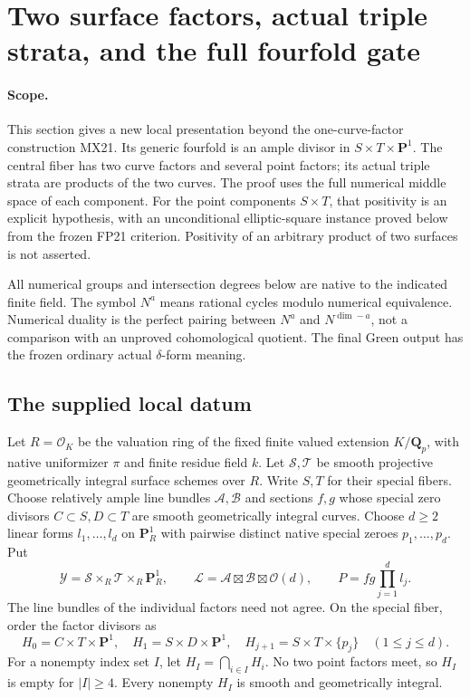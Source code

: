 \section{Two surface factors, actual triple strata, and the full fourfold gate}
\label{r22ds:section}

\paragraph{Scope.}
This section gives a new local presentation beyond the one-curve-factor
construction MX21.  Its generic fourfold is an ample divisor in
$S\times T\times\mathbf P^1$.  The central fiber has two curve
factors and several point factors; its actual triple strata are products
of the two curves.  The proof uses the full numerical middle space of
each component.  For the point components $S\times T$, that positivity
is an explicit hypothesis, with an unconditional elliptic-square
instance proved below from the frozen FP21 criterion.  Positivity of
an arbitrary product of two surfaces is not asserted.

All numerical groups and intersection degrees below are native to the
indicated finite field.  The symbol $N^a$ means rational cycles modulo
numerical equivalence.  Numerical duality is the perfect pairing between
$N^a$ and $N^{\dim-a}$, not a comparison with an unproved cohomological
quotient.  The final Green output has the frozen ordinary actual
$\delta$-form meaning.

\subsection{The supplied local datum}

Let $R=\mathcal O_K$ be the valuation ring of the fixed finite valued
extension $K/\mathbf Q_p$, with native uniformizer $\pi$ and finite
residue field $k$.  Let $\mathcal S,\mathcal T$ be smooth projective
geometrically integral surface schemes over $R$.  Write $S,T$ for
their special fibers.  Choose relatively ample line bundles
$\mathcal A,\mathcal B$ and sections $f,g$ whose special zero divisors
$C\subset S,D\subset T$ are smooth geometrically integral curves.
Choose $d\ge2$ linear forms $l_1,\ldots,l_d$ on $\mathbf P^1_R$
with pairwise distinct native special zeroes $p_1,\ldots,p_d$.
Put
\[
 \mathcal Y=\mathcal S\times_R\mathcal T\times_R\mathbf P^1_R,
 \qquad \mathcal L=\mathcal A\boxtimes\mathcal B\boxtimes\mathcal O(d),
 \qquad P=fg\prod_{j=1}^d l_j.
 \tag{DS22.1}\label{r22ds:datum}
\]
The line bundles of the individual factors need not agree.  On the
special fiber, order the factor divisors as
\[
 H_0=C\times T\times\mathbf P^1,\quad
 H_1=S\times D\times\mathbf P^1,\quad
 H_{j+1}=S\times T\times\{p_j\}\quad(1\le j\le d).
 \tag{DS22.2}\label{r22ds:factors}
\]
For a nonempty index set $I$, let $H_I=\bigcap_{i\in I}H_i$.
No two point factors meet, so $H_I$ is empty for $|I|\ge4$.
Every nonempty $H_I$ is smooth and geometrically integral.

